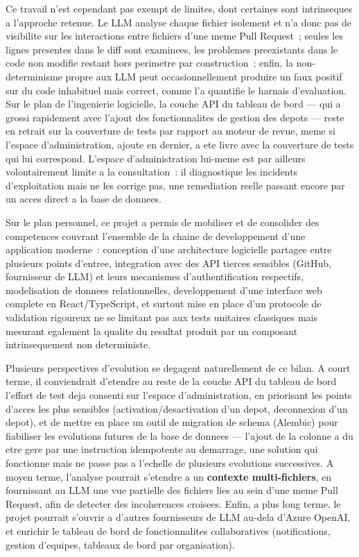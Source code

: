 \documentclass[a4paper,12pt,oneside]{report}
\begin{document}
Ce travail n'est cependant pas exempt de limites, dont certaines sont intrinseques a l'approche retenue. Le LLM analyse chaque fichier isolement et n'a donc pas de visibilite sur les interactions entre fichiers d'une meme Pull Request~; seules les lignes presentes dans le diff sont examinees, les problemes preexistants dans le code non modifie restant hors perimetre par construction~; enfin, la non-determinisme propre aux LLM peut occasionnellement produire un faux positif sur du code inhabituel mais correct, comme l'a quantifie le harnais d'evaluation. Sur le plan de l'ingenierie logicielle, la couche API du tableau de bord --- qui a grossi rapidement avec l'ajout des fonctionnalites de gestion des depots --- reste en retrait sur la couverture de tests par rapport au moteur de revue, meme si l'espace d'administration, ajoute en dernier, a ete livre avec la couverture de tests qui lui correspond. L'espace d'administration lui-meme est par ailleurs volontairement limite a la consultation~: il diagnostique les incidents d'exploitation mais ne les corrige pas, une remediation reelle passant encore par un acces direct a la base de donnees.

Sur le plan personnel, ce projet a permis de mobiliser et de consolider des competences couvrant l'ensemble de la chaine de developpement d'une application moderne~: conception d'une architecture logicielle partagee entre plusieurs points d'entree, integration avec des API tierces sensibles (GitHub, fournisseur de LLM) et leurs mecanismes d'authentification respectifs, modelisation de donnees relationnelles, developpement d'une interface web complete en React/TypeScript, et surtout mise en place d'un protocole de validation rigoureux ne se limitant pas aux tests unitaires classiques mais mesurant egalement la qualite du resultat produit par un composant intrinsequement non deterministe.

Plusieurs perspectives d'evolution se degagent naturellement de ce bilan. A court terme, il conviendrait d'etendre au reste de la couche API du tableau de bord l'effort de test deja consenti sur l'espace d'administration, en priorisant les points d'acces les plus sensibles (activation/desactivation d'un depot, deconnexion d'un depot), et de mettre en place un outil de migration de schema (Alembic) pour fiabiliser les evolutions futures de la base de donnees --- l'ajout de la colonne  a du etre gere par une instruction  idempotente au demarrage, une solution qui fonctionne mais ne passe pas a l'echelle de plusieurs evolutions successives. A moyen terme, l'analyse pourrait s'etendre a un \textbf{contexte multi-fichiers}, en fournissant au LLM une vue partielle des fichiers lies au sein d'une meme Pull Request, afin de detecter des incoherences croisees. Enfin, a plus long terme, le projet pourrait s'ouvrir a d'autres fournisseurs de LLM au-dela d'Azure OpenAI, et enrichir le tableau de bord de fonctionnalites collaboratives (notifications, gestion d'equipes, tableaux de bord par organisation).
\end{document}
